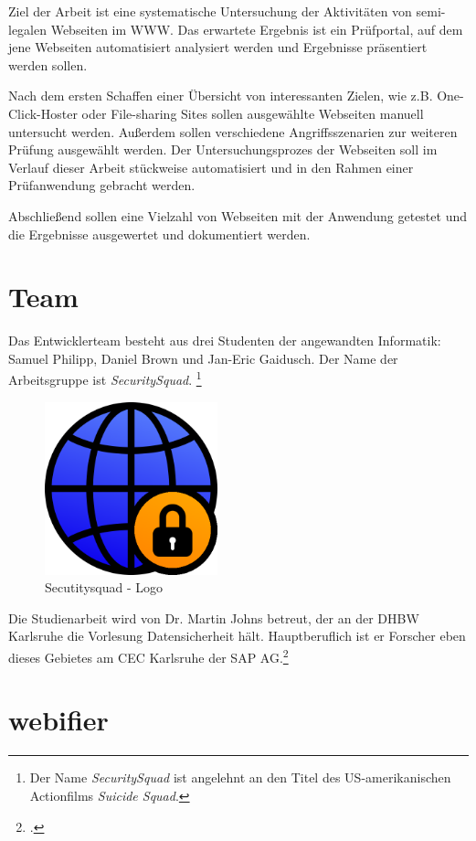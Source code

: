 Ziel der Arbeit ist eine systematische Untersuchung der Aktivitäten von semi-legalen Webseiten im \ac{WWW}. Das erwartete Ergebnis ist ein Prüfportal, auf dem jene Webseiten automatisiert analysiert werden und Ergebnisse präsentiert werden sollen.

Nach dem ersten Schaffen einer Übersicht von interessanten Zielen, wie z.B. One-Click-Hoster oder File-sharing Sites sollen ausgewählte Webseiten manuell untersucht werden. Außerdem sollen verschiedene Angriffsszenarien zur weiteren Prüfung ausgewählt werden. Der Untersuchungsprozes der Webseiten soll im Verlauf dieser Arbeit stückweise automatisiert und in den Rahmen einer Prüfanwendung gebracht werden.

Abschließend sollen eine Vielzahl von Webseiten mit der Anwendung getestet und die Ergebnisse ausgewertet und dokumentiert werden.

\section{Team}
Das Entwicklerteam besteht aus drei Studenten der angewandten Informatik:
Samuel Philipp, Daniel Brown und Jan-Eric Gaidusch.
Der Name der Arbeitsgruppe ist \textit{SecuritySquad}.
\footnote{Der Name \textit{SecuritySquad} ist angelehnt an den Titel des US-amerikanischen Actionfilms \textit{Suicide Squad}.}

\begin{figure}[H]
	\centering
	\includegraphics[width=5cm]{images/securitysquad}
	\caption{Secutitysquad - Logo}
	\label{fig:securitysquad-logo}
\end{figure}

Die Studienarbeit wird von Dr. Martin Johns betreut, der an der DHBW Karlsruhe die Vorlesung Datensicherheit hält. Hauptberuflich ist er Forscher eben dieses Gebietes am CEC Karlsruhe der SAP AG.\footcite[Vgl.][]{johnsProfile}

\section{webifier}

